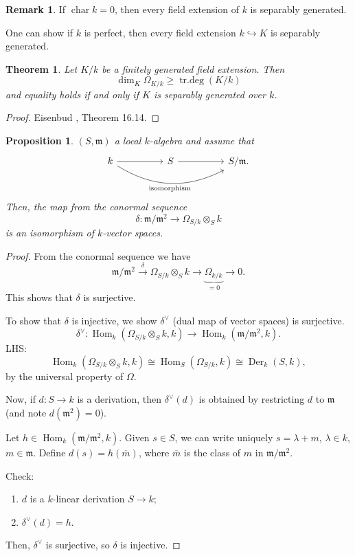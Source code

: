 \documentclass[12pt]{article}
\DeclareMathOperator{\Hom}{Hom}
\DeclareMathOperator{\chara}{char}
\DeclareMathOperator{\Der}{Der}
\DeclareMathOperator{\trdeg}{tr.deg}
\newtheorem*{proposition}{Proposition}
\newtheorem*{theorem}{Theorem}
\theoremstyle{definition}
\newtheorem*{remark}{Remark}
\begin{document}
\begin{remark}
If $\chara k=0$, then every field extension of $k$ is separably generated.

One can show if $k$ is perfect, then every field extension $k\hookrightarrow K$ is separably generated.
\end{remark}

\begin{theorem}
Let $K/k$ be a finitely generated field extension. Then
\[\dim_K\Omega_{K/k}\geq\trdeg(K/k)\]
and equality holds if and only if $K$ is separably generated over $k$.
\end{theorem}

\begin{proof}
Eisenbud \cite{eisenbud2013commutative}, Theorem 16.14.
\end{proof}

\begin{proposition}
$(S,\mathfrak m)$ a local $k$-algebra and assume that
\[\begin{tikzcd}k\arrow[rr]\arrow[rrrr,bend right,"\text{isomorphism}",swap]&&S\arrow[rr]&&S/\mathfrak m.\end{tikzcd}\]
Then, the map from the conormal sequence
\[\delta:\mathfrak m/\mathfrak m^2\longrightarrow\Omega_{S/k}\otimes_Sk\]
is an isomorphism of $k$-vector spaces.
\end{proposition}

\begin{proof}
From the conormal sequence we have
\[\mathfrak m/\mathfrak m^2\overset\delta\longrightarrow\Omega_{S/k}\otimes_Sk\longrightarrow\underbrace{\Omega_{k/k}}_{=0}\longrightarrow0.\]
This shows that $\delta$ is surjective.

To show that $\delta$ is injective, we show $\delta^\vee$ (dual map of vector spaces) is surjective.
\[\delta^\vee:\Hom_k(\Omega_{S/k}\otimes_Sk,k)\longrightarrow\Hom_k(\mathfrak m/\mathfrak m^2,k).\]
LHS:
\[\Hom_k(\Omega_{S/k}\otimes_Sk,k)\cong\Hom_S(\Omega_{S/k},k)\cong\Der_k(S,k),\]
by the universal property of $\Omega$.

Now, if $d:S\rightarrow k$ is a derivation, then $\delta^\vee(d)$ is obtained by restricting $d$ to $\mathfrak m$ (and note $d(\mathfrak m^2)=0$).

Let $h\in\Hom_k(\mathfrak m/\mathfrak m^2,k)$. Given $s\in S$, we can write uniquely $s=\lambda+m$, $\lambda\in k$, $m\in\mathfrak m$. Define $d(s)=h(\overline m)$, where $\overline m$ is the class of $m$ in $\mathfrak m/\mathfrak m^2$.

Check:
\begin{enumerate}[label=\arabic*)]
\item $d$ is a $k$-linear derivation $S\rightarrow k$;
\item $\delta^\vee(d)=h.$
\end{enumerate}
Then, $\delta^\vee$ is surjective, so $\delta$ is injective.
\end{proof}
\end{document}
